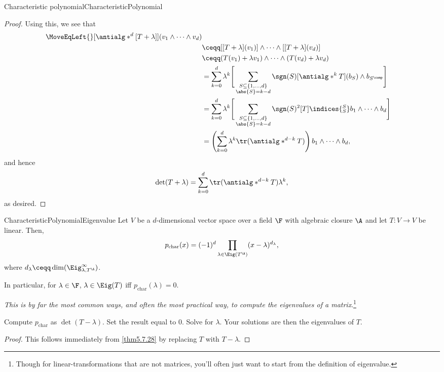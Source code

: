 \begin{thm}{Characteristic polynomial}{CharacteristicPolynomial}
\begin{proof}
		Using this, we see that
		\begin{equation*}
			\begin{split}
				\MoveEqLeft {}
				[\antialg* ^d[T+\lambda ]](v_1\wedge \cdots \wedge v_d) \\
				& \ceqq [[T+\lambda ](v_1)]\wedge \cdots \wedge [[T+\lambda ](v_d)] \\
				& \ceqq (T(v_1)+\lambda v_1)\wedge \cdots \wedge (T(v_d)+\lambda v_d) \\
				& =\sum _{k=0}^d\lambda ^k\Bigg[ \sum _{\substack{S\subseteq \{ 1,\ldots ,d\} \\ \abs{S}=k-d}}\sgn (S)[\antialg* ^kT](b_S)\wedge b_{S^{\comp}}\Bigg] \\
				& =\sum _{k=0}^d\lambda ^k\Bigg[ \sum _{\substack{S\subseteq \{ 1,\ldots ,d\} \\ \abs{S}=k-d}}\sgn (S)^2[T]\indices{^S_S}b_1\wedge \cdots \wedge b_d\Bigg] \\
				& =\left( \sum _{k=0}^d\lambda ^k\tr (\antialg* ^{d-k}T)\right) b_1\wedge \cdots \wedge b_d,
			\end{split}
		\end{equation*}
		and hence
		\begin{equation}
			\det (T+\lambda )=\sum _{k=0}^d\tr (\antialg* ^{d-k}T)\lambda ^k,
		\end{equation}
		as desired.
	\end{proof}
\end{thm}
\begin{thm}{}{CharacteristicPolynomialEigenvalue}
	Let $V$ be a $d$-dimensional vector space over a field $\F$ with algebraic closure $\A$ and let $T\colon V\rightarrow V$ be linear.  Then,
	\begin{equation}
		p_{\operatorname{char}}(x)=(-1)^d\prod _{\lambda \in \Eig (T^{\A})}(x-\lambda )^{d_{\lambda}},
	\end{equation}
	where $d_{\lambda}\ceqq \dim (\Eig _{\lambda ,T^{\A}}^{\infty})$.
	\begin{rmk}
		In particular, for $\lambda \in \F$, $\lambda \in \Eig (T)$ iff $p_{\operatorname{char}}(\lambda )=0$.
	\end{rmk}
	\begin{important}
		\emph{This is by far the most common ways, and often the most practical way, to compute the eigenvalues of a matrix}.\footnote{Though for linear-transformations that are not matrices, you'll often just want to start from the definition of eigenvalue.}
		
		Compute $p_{\operatorname{char}}$ as $\det (T-\lambda )$.  Set the result equal to $0$.  Solve for $\lambda$.  Your solutions are then the eigenvalues of $T$.
	\end{important}
	\begin{proof}
		This follows immediately from \cref{thm5.7.28} by replacing $T$ with $T-\lambda$.
	\end{proof}
\end{thm}

